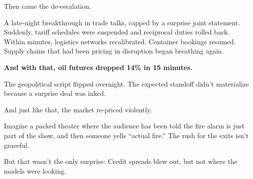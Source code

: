 \medskip


Then came the de-escalation.

A late-night breakthrough in trade talks, capped by a surprise joint statement. Suddenly, tariff schedules were 
suspended and reciprocal duties rolled back.  
Within minutes, logistics networks recalibrated. Container bookings resumed. Supply chains that had been pricing 
in disruption began breathing again.

\textbf{And with that, oil futures dropped 14\% in 15 minutes.}

The geopolitical script flipped overnight. The expected standoff didn’t materialize because a surprise 
deal was inked. 

And just like that, the market re-priced violently.

Imagine a packed theater where the audience has been told the fire alarm is just part of the show, and then someone 
yells “actual fire.” The rush for the exits isn’t graceful. 

But that wasn’t the only surprise: Credit spreads blew out, but not where the models were looking.

\medskip


